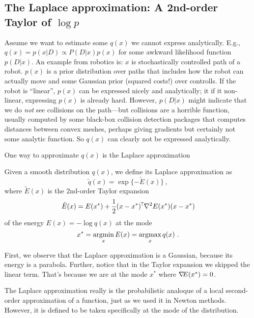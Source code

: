 \subsection{The Laplace approximation: A 2nd-order Taylor of
$\log p$}

Assume we want to estimate some $q(x)$ we cannot express
analytically. E.g., $q(x) =p(x|D) \propto P(D|x) p(x)$ for some
awkward likelihood function $p(D|x)$. An example from robotics is: $x$
is stochastically controlled path of a robot. $p(x)$ is a prior
distribution over paths that includes how the robot can actually move
and some Gaussian prior (squared costs!) over controlls. If the robot
is ``linear'', $p(x)$ can be expressed nicely and analytically; it if
it non-linear, expressing $p(x)$ is already hard. However, $p(D|x)$
might indicate that we do \emph{not} see collisions on the path---but
collisions are a horrible function, usually computed by some black-box
collision detection packages that computes distances between convex
meshes, perhaps giving gradients but certainly not some analytic
function. So $q(x)$ can clearly not be expressed analytically.

One way to approximate $q(x)$ is the Laplace approximation
\begin{myDefinition}
Given a smooth distribution $q(x)$, we define its Laplace approximation as
\begin{equation}
\tilde q(x) = \exp\{ - \tilde E(x) \} ~, 
\end{equation}
where $\tilde E(x)$ is the 2nd-order Taylor expansion
\begin{equation}
\tilde E(x) = E(x^*) + \frac{1}{2} (x-x^*)^{\!\top\!} {\nabla_{\!\!}^2} E(x^*) (x-x^*)
\end{equation}
of the energy $E(x) = -\log q(x)$ at the mode
\begin{equation}
x^* = \operatorname*{argmin}_x E(x) = \operatorname*{argmax}_x q(x) ~.
\end{equation}
\end{myDefinition}

First, we observe that the Laplace approximation is a Gaussian,
because its energy is a parabola. Further, notice that in the Taylor
expansion we skipped the linear term. That's because we are at the
mode $x^*$ where ${\nabla_{\!\!}} E(x^*)=0$.

The Laplace approximation really is the probabilistic analoque of a
local second-order approximation of a function, just as we used it in
Newton methods. However, it is defined to be taken specifically at the
mode of the distribution.

